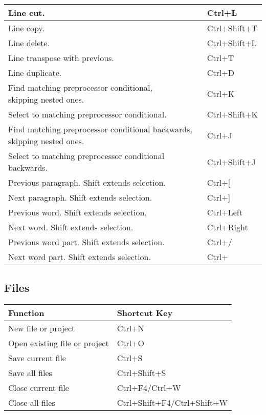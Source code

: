 \begin{tabular}{|l|l|}
Line cut. 	                    &   Ctrl+L\\ \hline
Line copy. 	                    &   Ctrl+Shift+T\\ \hline
Line delete. 	                &   Ctrl+Shift+L\\ \hline
Line transpose with previous. 	&   Ctrl+T\\ \hline
Line duplicate. 	            &   Ctrl+D\\ \hline
\makecell[l]{Find matching preprocessor conditional, \\
skipping nested ones.} 	        &   Ctrl+K \\ \hline
Select to matching preprocessor conditional. 	&   Ctrl+Shift+K\\ \hline
\makecell[l]{Find matching preprocessor conditional backwards, \\
skipping nested ones.} 	        &   Ctrl+J\\ \hline
Select to matching preprocessor conditional backwards. 	&   Ctrl+Shift+J\\ \hline
Previous paragraph. Shift extends selection.&   Ctrl+[\\ \hline
Next paragraph. Shift extends selection. 	&   Ctrl+]\\ \hline
Previous word. Shift extends selection. 	&   Ctrl+Left\\ \hline
Next word. Shift extends selection. 	    &   Ctrl+Right\\ \hline
Previous word part. Shift extends selection.&   Ctrl+/\\ \hline
Next word part. Shift extends selection. 	&   Ctrl+\osp \\ \hline
\end{tabular}

\subsection{Files}

\begin{tabular}{|l|l|}\hline
Function 		                &	Shortcut Key\\ \hline
New file or project 	        &	Ctrl+N\\ \hline
Open existing file or project   &	Ctrl+O\\ \hline
Save current file 	            &	Ctrl+S\\ \hline
Save all files 		            &	Ctrl+Shift+S\\ \hline
Close current file 	            &	Ctrl+F4/Ctrl+W\\ \hline
Close all files 	            &	Ctrl+Shift+F4/Ctrl+Shift+W\\ \hline
\end{tabular}

